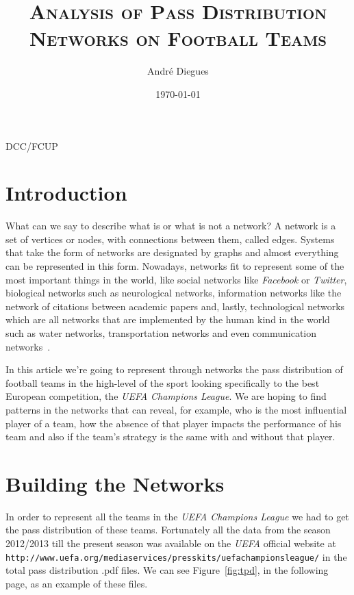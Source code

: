 \documentclass[12pt]{article}
\begin{document}
	\title{\textsc{Analysis of Pass Distribution Networks on Football Teams}}  
	\author{\begin{LARGE}Andr\'{e} Diegues\end{LARGE}}
    \date{\today}  
    \maketitle
    \begin{center} 
    DCC/FCUP
    \end{center}
	\thispagestyle{empty}
	\clearpage
	\tableofcontents
	\pagebreak
  \section{Introduction}\label{sec: intro}

What can we say to describe what is or what is not a network? A network is a set of vertices or nodes, with connections between them, called edges. Systems that take the form of networks are designated by graphs and almost everything can be represented in this form.
Nowadays, networks fit to represent some of the most important things in the world, like social networks like \textit{Facebook} or \textit{Twitter}, biological networks such as neurological networks, information networks like the network of citations between academic
papers and, lastly, technological networks which are all networks that are implemented by the human kind in the world such as water networks, transportation networks and even communication networks~\cite{Newman}. 

In this article we're going to represent through networks the pass distribution of football teams in the high-level of the sport looking specifically to the best European competition, the \textit{UEFA Champions League}. We are hoping to find patterns in the networks that can reveal, for example, who is the most influential player of a team, how the absence of that player impacts the performance of his team and also if the team's strategy is the same with and without that player.

\section{Building the Networks}\label{sec: build}

In order to represent all the teams in the \textit{UEFA Champions League} we had to get the pass distribution of these teams. Fortunately all the data from the season 2012/2013 till the present season was available on the \textit{UEFA} official website at \linebreak\texttt{http://www.uefa.org/mediaservices/presskits/uefachampionsleague/} in the total pass distribution .pdf files. We can see Figure~\ref{fig:tpd}, in the following page, as an example of these files.
\end{document}
